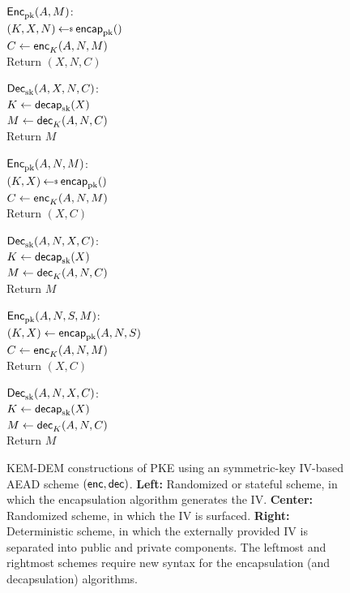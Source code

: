 \begin{figure}
\begin{center}
{
\underline{${\mathsf{Enc}}_{\mathrm{pk}}^{}(A, M)$}:\\[2pt]
$(K,X,\pubiv) \getsr \encap_\pk()$\\
$C \gets {\mathsf{enc}}_{K}^{}(A,N,M)$\\
Return $(X,N,C)$

\medskip
\underline{${\mathsf{Dec}}_{\mathrm{sk}}^{}(A,X,N,C)$}:\\[2pt]
$K \gets \mathsf{decap}_{\mathrm{sk}}(X)$\\
$M \gets {\mathsf{dec}}_{K}^{}(A,N,C)$\\
Return $M$
}
{
\underline{${\mathsf{Enc}}_{\mathrm{pk}}^{}(A,N,M)$}:\\[2pt]
$(K,X) \getsr \encap_\pk()$\\
$C \gets {\mathsf{enc}}_{K}^{}(A,N,M)$\\
Return $(X,C)$

\medskip
\underline{${\mathsf{Dec}}_{\mathrm{sk}}^{}(A,N,X,C)$}:\\[2pt]
$K \gets \mathsf{decap}_{\mathrm{sk}}(X)$\\
$M \gets {\mathsf{dec}}_{K}^{}(A,N,C)$\\
Return $M$

}
{
\underline{${\mathsf{Enc}}_{\mathrm{pk}}^{}(A,N,S,M)$}:\\[2pt]
$(K,X) \gets \mathsf{encap}_{\mathrm{pk}}(A,N,S)$\\
$C \gets {\mathsf{enc}}_{K}^{}(A,N,M)$\\
Return $(X,C)$

\medskip
\underline{${\mathsf{Dec}}_{\mathrm{sk}}^{}(A,N,X,C)$}:\\[2pt]
$K \gets \mathsf{decap}_{\mathrm{sk}}(X)$\\
$M \gets {\mathsf{dec}}_{K}^{}(A,N,C)$\\
Return $M$
}
\caption{KEM-DEM constructions of PKE using an symmetric-key IV-based AEAD scheme $({\mathsf{enc}},{\mathsf{dec}})$. \textbf{Left:} Randomized or stateful scheme, in which the encapsulation algorithm generates the IV.  \textbf{Center:} Randomized scheme, in which the IV is surfaced.  \textbf{Right:} Deterministic scheme, in which the externally provided IV is separated into public and private components. The leftmost and rightmost schemes require new syntax for the encapsulation (and decapsulation) algorithms.}
\label{fig:kem-dem options}
\end{center}
\end{figure}


